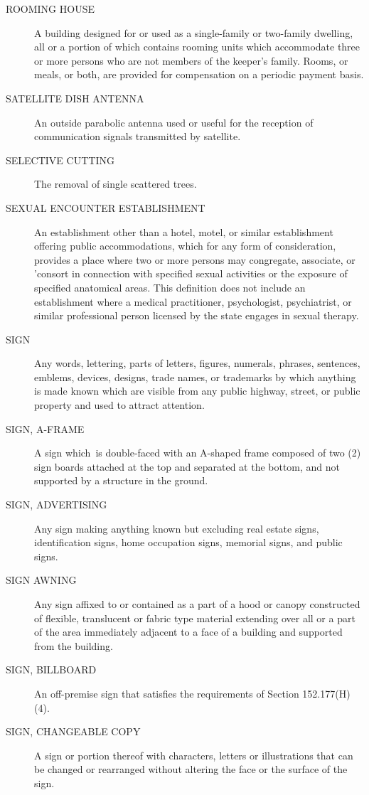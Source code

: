 \begin{description}
    \item[ROOMING HOUSE] A building designed for or used as a single-family or two-family dwelling, all or a portion of which contains rooming units which accommodate three or more persons who are not members of the keeper’s family.  Rooms, or meals, or both, are provided for compensation on a periodic payment basis.
    \item[SATELLITE DISH ANTENNA] An outside parabolic antenna used or useful for the reception of communication signals transmitted by satellite.
    \item[SELECTIVE CUTTING] The removal of single scattered trees.
    \item[SEXUAL ENCOUNTER ESTABLISHMENT] An establishment other than a hotel, motel, or similar establishment offering public accommodations, which for any form of consideration, provides a place where two or more persons may congregate, associate, or 'consort in connection with specified sexual activities or the exposure of specified anatomical areas. This definition does not include an establishment where a medical practitioner, psychologist, psychiatrist, or similar professional person licensed by the state engages in sexual therapy.
    \item[SIGN] Any words, lettering, parts of letters, figures, numerals, phrases, sentences, emblems, devices, designs, trade names, or trademarks by which anything is made known which are visible from any public highway, street, or public property and used to attract attention.
    \item[SIGN, A-FRAME] A sign which is double-faced with an A-shaped frame composed of two (2) sign boards attached at the top and separated at the bottom, and not supported by a structure in the ground.
    \item[SIGN, ADVERTISING] Any sign making anything known but excluding real estate signs, identification signs, home occupation signs, memorial signs, and public signs.
    \item[SIGN AWNING] Any sign affixed to or contained as a part of a hood or canopy constructed of flexible, translucent or fabric type material extending over all or a part of the area immediately adjacent to a face of a building and supported from the building.
    \item[SIGN, BILLBOARD] An off-premise sign that satisfies the requirements of Section 152.177(H)(4).
    \item[SIGN, CHANGEABLE COPY] A sign or portion thereof with characters, letters or illustrations that can be changed or rearranged without altering the face or the surface of the sign.

\end{description}
